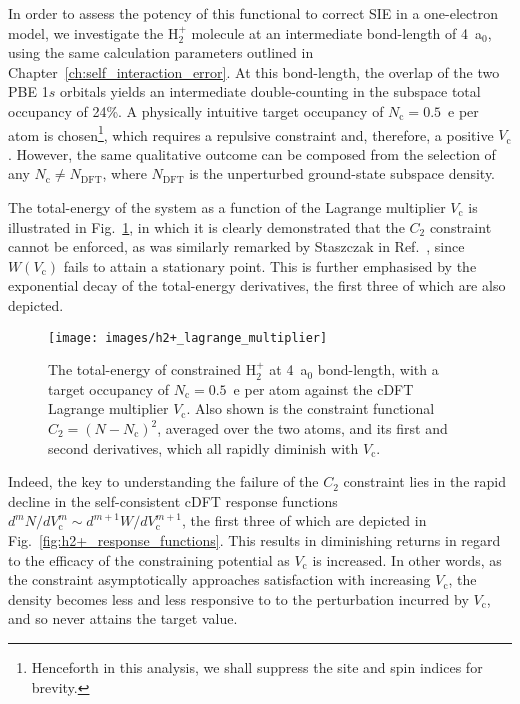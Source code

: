 {
In order to assess the potency 
of this functional to correct SIE 
in a one-electron model, 
we investigate the H$_2^+$ molecule}
at an intermediate bond-length of 4~a$_0$, 
using the same calculation parameters 
outlined in Chapter~\ref{ch:self_interaction_error}.
%
{
At this bond-length, 
the overlap of the two PBE 1$s$ orbitals   
yields an intermediate double-counting 
in the subspace total occupancy of 24\%}. 
%
A physically intuitive target occupancy of
$N_\textrm{c} = 0.5$~e per atom is 
chosen\footnote{{Henceforth in this analysis, 
we shall suppress the site and spin indices for brevity.}}, 
which requires a repulsive constraint 
and, therefore, a positive $V_\textrm{c}$.
%
However, the same qualitative outcome 
can be composed from the selection of any 
$N_\textrm{c} \ne N_\textrm{DFT}$, 
where $N_\textrm{DFT}$ 
is the unperturbed ground-state subspace density.

The total-energy of the system 
as a function of the Lagrange multiplier $V_\textrm{c}$ 
is illustrated in Fig.~\ref{fig:h2+_lagrange_multiplier}, 
in which it is clearly demonstrated 
that the $C_2$ constraint cannot be enforced, 
as was similarly remarked by Staszczak in Ref.~\cite{Staszczak2010}, 
since $W \left( V_\textrm{c} \right)$ 
fails to attain a stationary point.
%
This is further emphasised by the exponential decay 
of the total-energy derivatives, 
the first three of which are also depicted.

\begin{figure}[th!]
\centering
\texttt{[image: images/h2+\_lagrange\_multiplier]}
\caption[Total-energy of constrained H$_2^+$ vs Lagrange multiplier]
{The total-energy of constrained H$_2^+$ at 4~a$_0$ bond-length, 
with a target occupancy of $N_\textrm{c}=0.5$~e per atom 
against the cDFT Lagrange multiplier $V_\textrm{c}$. 
%
Also shown is the constraint functional 
$C_2=(N-N_\textrm{c})^2$,
averaged over the two atoms, and its
first and second derivatives, 
which all rapidly diminish with $V_\textrm{c}$.}
\label{fig:h2+_lagrange_multiplier}
\end{figure}



Indeed, the key to understanding 
the failure of the  $C_2$ constraint
lies in the rapid {decline} in the 
self-consistent cDFT response 
functions~\cite{PhysRevB.94.035159} 
$d^m N/d V_\textrm{c}^m\sim d^{m+1} W/d V_\textrm{c}^{m+1}$, 
the first three of which are 
depicted in Fig.~\ref{fig:h2+_response_functions}.
%
This results in diminishing returns 
in regard to the efficacy of the constraining potential 
as $V_\textrm{c}$ is increased.
%
In other words, 
as the constraint asymptotically 
approaches satisfaction with
increasing $V_\textrm{c}$, 
the density becomes less and less 
responsive to to the perturbation 
incurred by $V_\textrm{c}$, 
and so never attains the target value.

